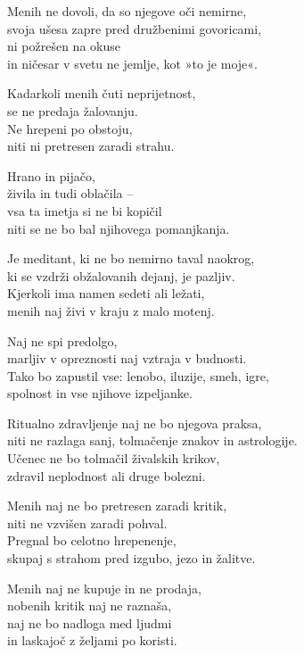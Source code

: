 Menih ne dovoli, da so njegove oči nemirne,\\
svoja ušesa zapre pred družbenimi govoricami,\\
ni požrešen na okuse\\
in ničesar v svetu ne jemlje, kot »to je moje«.

Kadarkoli menih čuti neprijetnost,\\
se ne predaja žalovanju.\\
Ne hrepeni po obstoju,\\
niti ni pretresen zaradi strahu.

Hrano in pijačo,\\
živila in tudi oblačila --\\
vsa ta imetja si ne bi kopičil\\
niti se ne bo bal njihovega pomanjkanja.

Je meditant, ki ne bo nemirno taval naokrog,\\
ki se vzdrži obžalovanih dejanj, je pazljiv.\\
Kjerkoli ima namen sedeti ali ležati,\\
menih naj živi v kraju z malo motenj.

Naj ne spi predolgo,\\
marljiv v opreznosti naj vztraja v budnosti.\\
Tako bo zapustil vse: lenobo, iluzije, smeh, igre,\\
spolnost in vse njihove izpeljanke.

Ritualno zdravljenje naj ne bo njegova praksa,\\
niti ne razlaga sanj, tolmačenje znakov in astrologije.\\
Učenec ne bo tolmačil živalskih krikov,\\
zdravil neplodnost ali druge bolezni.

Menih naj ne bo pretresen zaradi kritik,\\
niti ne vzvišen zaradi pohval.\\
Pregnal bo celotno hrepenenje,\\
skupaj s strahom pred izgubo, jezo in žalitve.

Menih naj ne kupuje in ne prodaja,\\
nobenih kritik naj ne raznaša,\\
naj ne bo nadloga med ljudmi\\
in laskajoč z željami po koristi.

